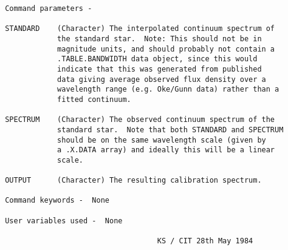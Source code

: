 \begin{description}
\begin{verbatim}
 Command parameters -

 STANDARD    (Character) The interpolated continuum spectrum of
             the standard star.  Note: This should not be in
             magnitude units, and should probably not contain a
             .TABLE.BANDWIDTH data object, since this would
             indicate that this was generated from published
             data giving average observed flux density over a
             wavelength range (e.g. Oke/Gunn data) rather than a
             fitted continuum.

 SPECTRUM    (Character) The observed continuum spectrum of the
             standard star.  Note that both STANDARD and SPECTRUM
             should be on the same wavelength scale (given by
             a .X.DATA array) and ideally this will be a linear
             scale.

 OUTPUT      (Character) The resulting calibration spectrum.

 Command keywords -  None

 User variables used -  None

                                    KS / CIT 28th May 1984
\end{verbatim}
\end{description}
